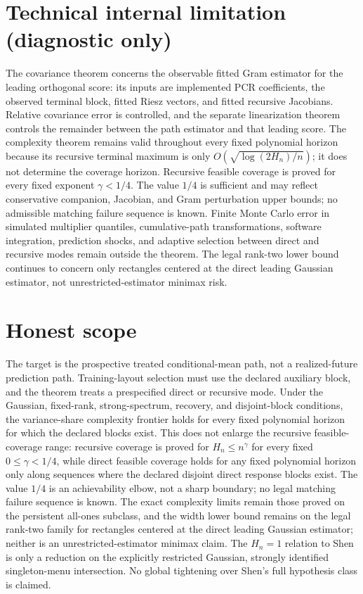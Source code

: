 \documentclass{article}
\begin{document}
\section*{Technical internal limitation (diagnostic only)}

The covariance theorem concerns the observable fitted Gram estimator for the leading orthogonal score: its inputs are implemented PCR coefficients, the observed terminal block, fitted Riesz vectors, and fitted recursive Jacobians. Relative covariance error is controlled, and the separate linearization theorem controls the remainder between the path estimator and that leading score. The complexity theorem remains valid throughout every fixed polynomial horizon because its recursive terminal maximum is only \(O(\sqrt{\log(2H_n)/n})\); it does not determine the coverage horizon. Recursive feasible coverage is proved for every fixed exponent \(\gamma<1/4\). The value \(1/4\) is sufficient and may reflect conservative companion, Jacobian, and Gram perturbation upper bounds; no admissible matching failure sequence is known. Finite Monte Carlo error in simulated multiplier quantiles, cumulative-path transformations, software integration, prediction shocks, and adaptive selection between direct and recursive modes remain outside the theorem. The legal rank-two lower bound continues to concern only rectangles centered at the direct leading Gaussian estimator, not unrestricted-estimator minimax risk.

\section{Honest scope}

The target is the prospective treated conditional-mean path, not a realized-future prediction path. Training-layout selection must use the declared auxiliary block, and the theorem treats a prespecified direct or recursive mode. Under the Gaussian, fixed-rank, strong-spectrum, recovery, and disjoint-block conditions, the variance-share complexity frontier holds for every fixed polynomial horizon for which the declared blocks exist. This does not enlarge the recursive feasible-coverage range: recursive coverage is proved for \(H_n\le n^\gamma\) for every fixed \(0\le\gamma<1/4\), while direct feasible coverage holds for any fixed polynomial horizon only along sequences where the declared disjoint direct response blocks exist. The value \(1/4\) is an achievability elbow, not a sharp boundary; no legal matching failure sequence is known. The exact complexity limits remain those proved on the persistent all-ones subclass, and the width lower bound remains on the legal rank-two family for rectangles centered at the direct leading Gaussian estimator; neither is an unrestricted-estimator minimax claim. The \(H_n=1\) relation to Shen is only a reduction on the explicitly restricted Gaussian, strongly identified singleton-menu intersection. No global tightening over Shen's full hypothesis class is claimed.
\end{document}
